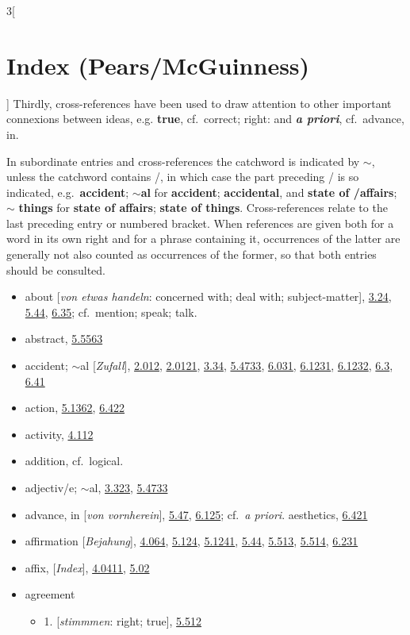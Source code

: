 \documentclass[oneside,openany,12pt]{book}
\newcommand{\indexentry}[1]{\item #1}
\newcommand{\indexsubentry}[1]{\begin{itemize} \item #1 \end{itemize}}
\newcommand{\indexref}[1]{\hyperlink{prop#1}{#1}}
\begin{document}
\begin{multicols}{3}[\section*{Index (Pears/McGuinness)}]
Thirdly, cross-references have been used to draw attention to other important connexions between ideas, e.g. \textbf{true}, cf.\ correct; right: and \textbf{\textit{a priori}}, cf.\ advance, in.

In subordinate entries and cross-references the catchword is indicated by $\sim$, unless the catchword contains /, in which case the part preceding / is so indicated, e.g.\ \textbf{accident}; $\sim$\textbf{al} for \textbf{accident}; \textbf{accidental}, and \textbf{state of /affairs}; $\sim$ \textbf{things} for \textbf{state of affairs}; \textbf{state of things}. Cross-references relate to the last preceding entry or numbered bracket. When references are given both for a word in its own right and for a phrase containing it, occurrences of the latter are generally not also counted as occurrences of the former, so that both entries should be consulted.%


\bigskip

\bigskip
\begin{itemize}
\raggedright
\indexentry{about [\textit{von etwas handeln}: concerned with; deal with; subject-matter], \indexref{3.24}, \indexref{5.44}, \indexref{6.35}; cf.\ mention; speak; talk.}

\indexentry{abstract, \indexref{5.5563}}

\indexentry{accident; $\sim$al [\textit{Zufall}], \indexref{2.012}, \indexref{2.0121}, \indexref{3.34}, \indexref{5.4733}, \indexref{6.031}, \indexref{6.1231}, \indexref{6.1232}, \indexref{6.3}, \indexref{6.41}}

\indexentry{action, \indexref{5.1362}, \indexref{6.422}}

\indexentry{activity, \indexref{4.112}}

\indexentry{addition, cf.\ logical.}

\indexentry{adjectiv/e; $\sim$al, \indexref{3.323}, \indexref{5.4733}}

\indexentry{advance, in [\textit{von vornherein}], \indexref{5.47}, \indexref{6.125}; cf.\ \textit{a priori}. aesthetics, \indexref{6.421}}

\indexentry{affirmation [\textit{Bejahung}], \indexref{4.064}, \indexref{5.124}, \indexref{5.1241}, \indexref{5.44}, \indexref{5.513}, \indexref{5.514}, \indexref{6.231}}

\indexentry{affix, [\textit{Index}], \indexref{4.0411}, \indexref{5.02}}

\indexentry{agreement}

   \indexsubentry{1. [\textit{stimmmen}: right; true], \indexref{5.512}}


\end{itemize}
\end{multicols}
\end{document}
